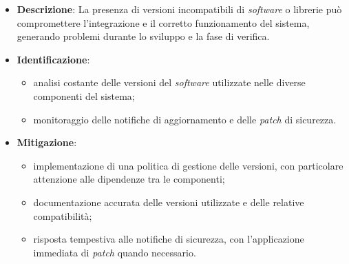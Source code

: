 \label{risk:incompatibilità delle versioni del software}
\begin{itemize}
	\item \textbf{Descrizione}:  La presenza di versioni incompatibili di \textit{software} o librerie 
								può compromettere l'integrazione e il corretto funzionamento del 
								sistema, generando problemi durante lo sviluppo e la fase di verifica.
	\item \textbf{Identificazione}:
	      \begin{itemize}
		      \item analisi costante delle versioni del \textit{software} utilizzate nelle diverse componenti del sistema;
		      
			  \item monitoraggio delle notifiche di aggiornamento e delle \textit{patch} di sicurezza.
	      \end{itemize}

	\item \textbf{Mitigazione}:
	      \begin{itemize}
		      \item implementazione di una politica di gestione delle versioni, 
			  		con particolare attenzione alle dipendenze tra le componenti;

		      \item documentazione accurata delle versioni utilizzate e delle relative compatibilità;
		      
			  \item risposta tempestiva alle notifiche di sicurezza, con l'applicazione immediata di \textit{patch} quando necessario.
	      \end{itemize}
\end{itemize}
